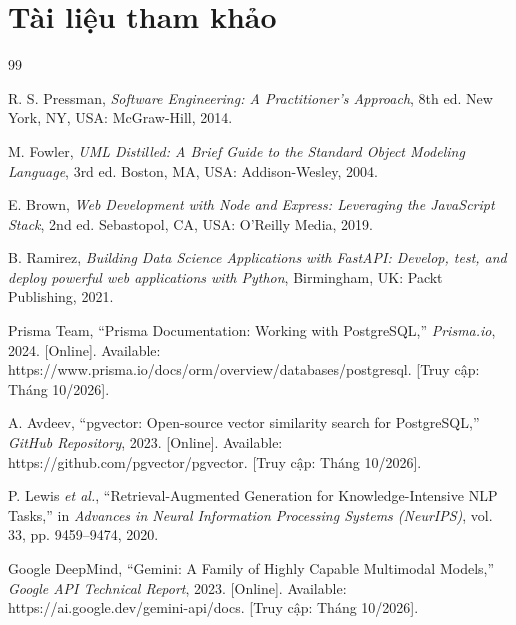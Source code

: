 \section{Tài liệu tham khảo}
\renewcommand{\refname}{} %
\begin{thebibliography}{99}

R. S. Pressman, \emph{Software Engineering: A Practitioner's Approach}, 8th ed. New York, NY, USA: McGraw-Hill, 2014.

M. Fowler, \emph{UML Distilled: A Brief Guide to the Standard Object Modeling Language}, 3rd ed. Boston, MA, USA: Addison-Wesley, 2004.

E. Brown, \emph{Web Development with Node and Express: Leveraging the JavaScript Stack}, 2nd ed. Sebastopol, CA, USA: O'Reilly Media, 2019.

B. Ramirez, \emph{Building Data Science Applications with FastAPI: Develop, test, and deploy powerful web applications with Python}, Birmingham, UK: Packt Publishing, 2021.

Prisma Team, ``Prisma Documentation: Working with PostgreSQL,'' \emph{Prisma.io}, 2024. [Online]. Available: https://www.prisma.io/docs/orm/overview/databases/postgresql. [Truy cập: Tháng 10/2026].

A. Avdeev, ``pgvector: Open-source vector similarity search for PostgreSQL,'' \emph{GitHub Repository}, 2023. [Online]. Available: https://github.com/pgvector/pgvector. [Truy cập: Tháng 10/2026].

P. Lewis \emph{et al.}, ``Retrieval-Augmented Generation for Knowledge-Intensive NLP Tasks,'' in \emph{Advances in Neural Information Processing Systems (NeurIPS)}, vol. 33, pp. 9459--9474, 2020.

Google DeepMind, ``Gemini: A Family of Highly Capable Multimodal Models,'' \emph{Google API Technical Report}, 2023. [Online]. Available: https://ai.google.dev/gemini-api/docs. [Truy cập: Tháng 10/2026].

\end{thebibliography}
